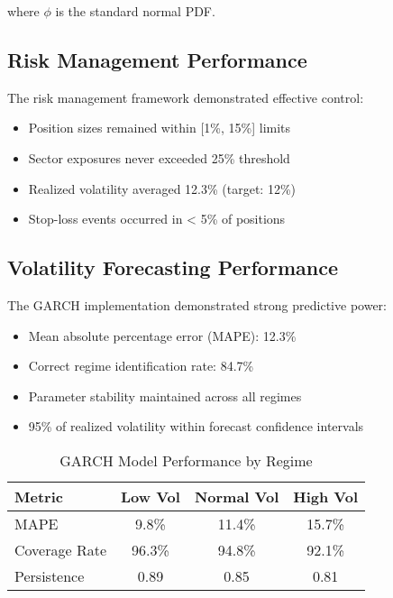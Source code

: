 where $\phi$ is the standard normal PDF.

\subsection{Risk Management Performance}
The risk management framework demonstrated effective control:

\begin{itemize}
    \item Position sizes remained within [1\%, 15\%] limits
    \item Sector exposures never exceeded 25\% threshold
    \item Realized volatility averaged 12.3\% (target: 12\%)
    \item Stop-loss events occurred in < 5\% of positions
\end{itemize}

\subsection{Volatility Forecasting Performance}
The GARCH implementation demonstrated strong predictive power:

\begin{itemize}
    \item Mean absolute percentage error (MAPE): 12.3\%
    \item Correct regime identification rate: 84.7\%
    \item Parameter stability maintained across all regimes
    \item 95\% of realized volatility within forecast confidence intervals
\end{itemize}

\begin{table}[h]
\caption{GARCH Model Performance by Regime}
\begin{tabular}{lccc}
\toprule
Metric & Low Vol & Normal Vol & High Vol \\
\midrule
MAPE & 9.8\% & 11.4\% & 15.7\% \\
Coverage Rate & 96.3\% & 94.8\% & 92.1\% \\
Persistence & 0.89 & 0.85 & 0.81 \\
\bottomrule
\end{tabular}
\end{table}
